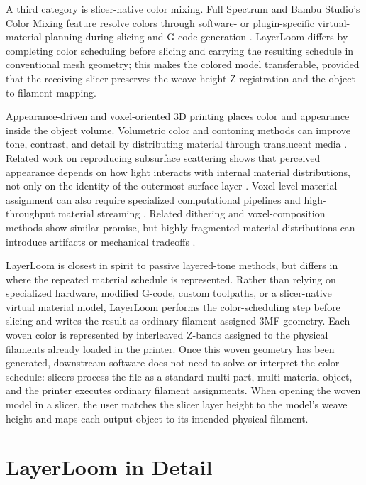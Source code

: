 \documentclass[5p,times,numbers]{elsarticle}
\begin{document}
A third category is slicer-native color mixing. Full Spectrum and Bambu Studio's Color Mixing feature resolve colors through software- or plugin-specific virtual-material planning during slicing and G-code generation \citep{ratdoux2026fullspectrum,bambu2026studio253}. LayerLoom differs by completing color scheduling before slicing and carrying the resulting schedule in conventional mesh geometry; this makes the colored model transferable, provided that the receiving slicer preserves the weave-height Z registration and the object-to-filament mapping.

Appearance-driven and voxel-oriented 3D printing places color and appearance inside the object volume. Volumetric color and contoning methods can improve tone, contrast, and detail by distributing material through translucent media \citep{babaei2017color,brunton2016pushing}. Related work on reproducing subsurface scattering shows that perceived appearance depends on how light interacts with internal material distributions, not only on the identity of the outermost surface layer \citep{dong2010fabricating,hasan2010physical,sumin2019geometry,rittig2021neural}. Voxel-level material assignment can also require specialized computational pipelines and high-throughput material streaming \citep{vidimce2013openfab}. Related dithering and voxel-composition methods show similar promise, but highly fragmented material distributions can introduce artifacts or mechanical tradeoffs \citep{cho2003dithering,willmott2023three,morsy2022shape}.

LayerLoom is closest in spirit to passive layered-tone methods, but differs in where the repeated material schedule is represented. Rather than relying on specialized hardware, modified G-code, custom toolpaths, or a slicer-native virtual material model, LayerLoom performs the color-scheduling step before slicing and writes the result as ordinary filament-assigned 3MF geometry. Each woven color is represented by interleaved Z-bands assigned to the physical filaments already loaded in the printer. Once this woven geometry has been generated, downstream software does not need to solve or interpret the color schedule: slicers process the file as a standard multi-part, multi-material object, and the printer executes ordinary filament assignments. When opening the woven model in a slicer, the user matches the slicer layer height to the model's weave height and maps each output object to its intended physical filament.


\section{LayerLoom in Detail}
\end{document}
